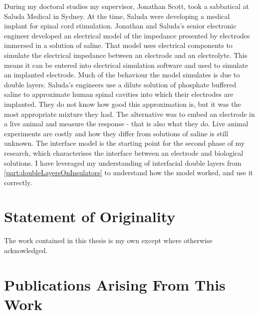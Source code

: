   During my doctoral studies my supervisor, Jonathan Scott, took a sabbatical at Saluda Medical in Sydney.
  At the time, Saluda were developing a medical implant for spinal cord stimulation.
  Jonathan and Saluda's senior electronic engineer developed an electrical model of the impedance presented by electrodes immersed in a solution of saline.
  That model uses electrical components to simulate the electrical impedance between an electrode and an electrolyte.
  This means it can be entered into electrical simulation software and used to simulate an implanted electrode.
  Much of the behaviour the model simulates is due to double layers.
  Saluda's engineers use a dilute solution of phosphate buffered saline to approximate human spinal cavities into which their electrodes are implanted.
  They do not know how good this approximation is, but it was the most appropriate mixture they had.
  The alternative was to embed an electrode in a live animal and measure the response - that is also what they do.
  Live animal experiments are costly and how they differ from solutions of saline is still unknown.
  The interface model is the starting point for the second phase of my research, which characterises the interface between an electrode and biological solutions.
  I have leveraged my understanding of interfacial double layers from \cref{part:doubleLayersOnInsulators} to understand how the model worked, and use it correctly.


\section{Statement of Originality}

  The work contained in this thesis is my own except where otherwise acknowledged.


\section{Publications Arising From This Work}


